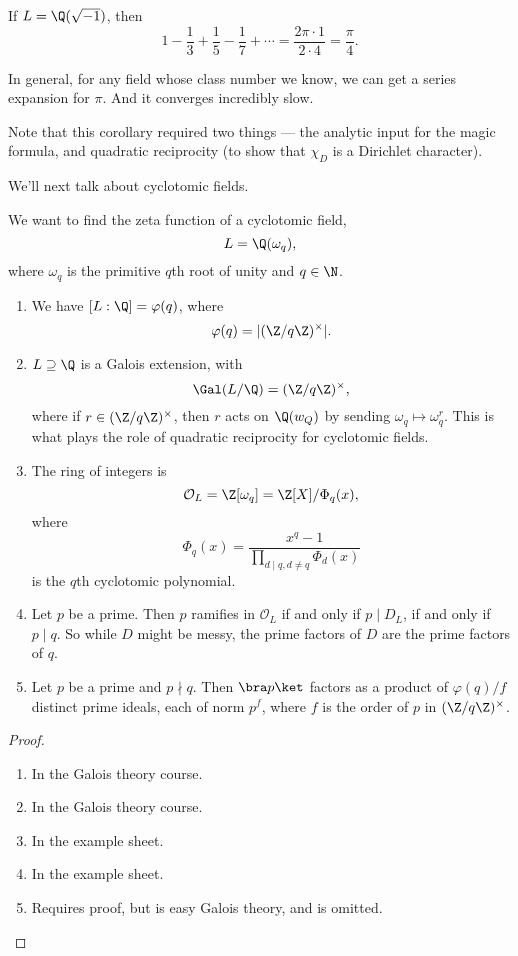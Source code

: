 \documentclass[a4paper]{article}
\begin{document}
\begin{eg}
  If $L = \Q(\sqrt{-1})$, then
  \[
    1 - \frac{1}{3} + \frac{1}{5} - \frac{1}{7} + \cdots= \frac{2\pi \cdot 1}{2 \cdot 4} = \frac{\pi}{4}.
  \]
\end{eg}
In general, for any field whose class number we know, we can get a series expansion for $\pi$. And it converges incredibly slow.

Note that this corollary required two things --- the analytic input for the magic formula, and quadratic reciprocity (to show that $\chi_D$ is a Dirichlet character).

We'll next talk about cyclotomic fields.

We want to find the zeta function of a cyclotomic field,
\[
  L = \Q(\omega_q),
\]
where $\omega_q$ is the primitive $q$th root of unity and $q\in \N$.
\begin{prop}\leavevmode
  \begin{enumerate}
    \item We have $[L:\Q] = \varphi(q)$, where
      \[
        \varphi(q) = |(\Z/q\Z)^\times|.
      \]
    \item $L \supseteq \Q$ is a Galois extension, with
      \[
        \Gal(L/\Q) = (\Z/q\Z)^\times,
      \]
      where if $r \in (\Z/q\Z)^\times$, then $r$ acts on $\Q(w_Q)$ by sending $\omega_q \mapsto \omega_q^r$. This is what plays the role of quadratic reciprocity for cyclotomic fields.
    \item The ring of integers is
      \[
        \mathcal{O}_L = \Z[\omega_q] = \Z[X]/\Phi_q(x),
      \]
      where
      \[
        \Phi_q(x) = \frac{x^q - 1}{\prod_{d \mid q, d \not= q}\Phi_d(x)}
      \]
      is the $q$th cyclotomic polynomial.
    \item Let $p$ be a prime. Then $p$ ramifies in $\mathcal{O}_L$ if and only if $p \mid D_L$, if and only if $p \mid q$. So while $D$ might be messy, the prime factors of $D$ are the prime factors of $q$.
    \item Let $p$ be a prime and $p \nmid q$. Then $\bra p\ket$ factors as a product of $\varphi(q)/f$ distinct prime ideals, each of norm $p^f$, where $f$ is the order of $p$ in $(\Z/q\Z)^{\times}$.
  \end{enumerate}
\end{prop}

\begin{proof}\leavevmode
  \begin{enumerate}
    \item In the Galois theory course.
    \item In the Galois theory course.
    \item In the example sheet.
    \item In the example sheet.
    \item Requires proof, but is easy Galois theory, and is omitted.
  \end{enumerate}
\end{proof}
\end{document}
